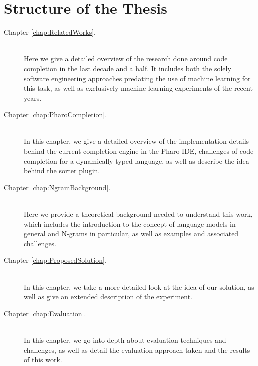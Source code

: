 \section{Structure of the Thesis}
\label{sec:Introduction-Structure}
{\hypersetup{linkcolor=black}
\begin{description}
	\item [Chapter \ref{chap:RelatedWorks}. ] \hfill \\
	Here we give a detailed overview of the research done around code completion in the last decade and a half. It includes both the solely software engineering approaches predating the use of machine learning for this task, as well as exclusively machine learning experiments of the recent years.
    \item [Chapter \ref{chap:PharoCompletion}. ] \hfill \\
	In this chapter, we give a detailed overview of the implementation details behind the current completion engine in the Pharo IDE, challenges of code completion for a dynamically typed language, as well as describe the idea behind the sorter plugin.
	\item [Chapter \ref{chap:NgramBackground}. ] \hfill \\
    Here we provide a theoretical background needed to understand this work, which includes the introduction to the concept of language models in general and N-grams in particular, as well as examples and associated challenges.
    \item [Chapter \ref{chap:ProposedSolution}. ] \hfill \\
	In this chapter, we take a more detailed look at the idea of our solution, as well as give an extended description of the experiment.
	\item [Chapter \ref{chap:Evaluation}. ] \hfill \\
	In this chapter, we go into depth about evaluation techniques and challenges, as well as detail the evaluation approach taken and the results of this work.
\end{description}
}